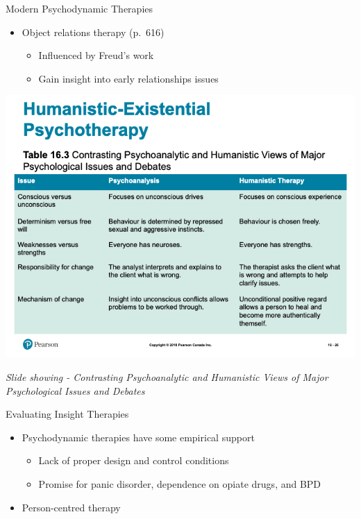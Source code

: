 \documentclass[
]{book}
\providecommand{\tightlist}{%
  \setlength{\itemsep}{0pt}\setlength{\parskip}{0pt}}
\begin{document}
\begin{reflect}
Modern Psychodynamic Therapies

\begin{itemize}
\tightlist
\item
  Object relations therapy (p.~616)

  \begin{itemize}
  \tightlist
  \item
    Influenced by Freud's work\\
  \item
    Gain insight into early relationships issues
  \end{itemize}
\end{itemize}

\includegraphics{assets/unit_11/slide_26.png}

\emph{Slide showing - Contrasting Psychoanalytic and Humanistic Views of Major Psychological Issues and Debates}

Evaluating Insight Therapies

\begin{itemize}
\tightlist
\item
  Psychodynamic therapies have some empirical support

  \begin{itemize}
  \tightlist
  \item
    Lack of proper design and control conditions\\
  \item
    Promise for panic disorder, dependence on opiate drugs, and BPD\\
  \end{itemize}
\item
  Person-centred therapy


\end{itemize}
\end{reflect}
\end{document}
